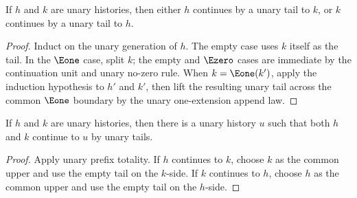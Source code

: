 \begin{theorem}
\label{thm:nat-unary-prefix-total}
If \(h\) and \(k\) are unary histories, then either \(h\) continues by a unary
tail to \(k\), or \(k\) continues by a unary tail to \(h\).
\end{theorem}
\begin{proof}
Induct on the unary generation of \(h\). The empty case uses \(k\) itself as
the tail. In the \(\Eone\) case, split \(k\); the empty and \(\Ezero\) cases
are immediate by the continuation unit and unary no-zero rule. When
\(k=\Eone(k')\), apply the induction hypothesis to \(h'\) and \(k'\), then
lift the resulting unary tail across the common \(\Eone\) boundary by the
unary one-extension append law.
\end{proof}

\begin{theorem}
\label{thm:nat-unary-prefix-directed-common-upper}
If $h$ and $k$ are unary histories, then there is a unary history $u$ such
that both $h$ and $k$ continue to $u$ by unary tails.
\end{theorem}
\begin{proof}
Apply unary prefix totality. If $h$ continues to $k$, choose $k$ as the
common upper and use the empty tail on the $k$-side. If $k$ continues to
$h$, choose $h$ as the common upper and use the empty tail on the $h$-side.
\end{proof}

